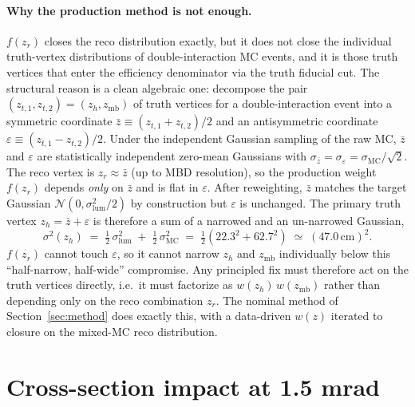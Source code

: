\documentclass[11pt,a4paper]{article}
\begin{document}
\paragraph{Why the production method is not enough.}
$f(z_r)$ closes the reco distribution exactly, but it does not close the
individual truth-vertex distributions of double-interaction MC events,
and it is those truth vertices that enter the efficiency denominator via
the truth fiducial cut. The structural reason is a clean algebraic one:
decompose the pair $(z_{t,1},z_{t,2}) = (z_h, z_\mathrm{mb})$ of truth
vertices for a double-interaction event into a symmetric coordinate
$\bar z \equiv (z_{t,1}+z_{t,2})/2$ and an antisymmetric coordinate
$\varepsilon \equiv (z_{t,1}-z_{t,2})/2$. Under the independent Gaussian
sampling of the raw MC, $\bar z$ and $\varepsilon$ are statistically
independent zero-mean Gaussians with
$\sigma_{\bar z} = \sigma_\varepsilon = \sigma_\mathrm{MC}/\sqrt 2$.
The reco vertex is $z_r \approx \bar z$ (up to MBD resolution), so the
production weight $f(z_r)$ depends \emph{only} on $\bar z$ and is flat
in $\varepsilon$.
After reweighting, $\bar z$ matches the target Gaussian
$\mathcal{N}(0,\sigma_\mathrm{lum}^2/2)$ by construction but
$\varepsilon$ is unchanged. The primary truth vertex
$z_h = \bar z + \varepsilon$ is therefore a sum of a narrowed and an
un-narrowed Gaussian,
\begin{equation}
\sigma^2(z_h)
  \;=\; \tfrac{1}{2}\,\sigma_\mathrm{lum}^2 \;+\; \tfrac{1}{2}\,\sigma_\mathrm{MC}^2
  \;=\; \tfrac{1}{2}(22.3^2 + 62.7^2)
  \;\simeq\; (47.0\,\mathrm{cm})^2.
\label{eq:half_narrow_half_wide}
\end{equation}
$f(z_r)$ cannot touch $\varepsilon$, so it cannot narrow $z_h$ and
$z_\mathrm{mb}$ individually below this ``half-narrow, half-wide''
compromise. Any principled fix must therefore act on the truth vertices
directly, i.e.\ it must factorize as
$w(z_h)\,w(z_\mathrm{mb})$ rather than depending only on the reco
combination $z_r$. The nominal method of
Section~\ref{sec:method} does exactly this, with a data-driven
$w(z)$ iterated to closure on the mixed-MC reco distribution.

\section{Cross-section impact at 1.5 mrad}
\label{sec:xsec_impact}
\end{document}

